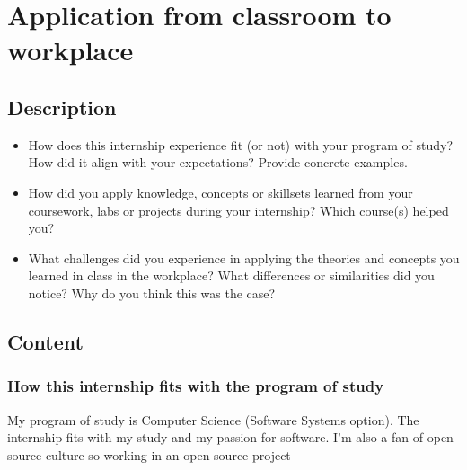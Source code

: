 \newpage
\section{Application from classroom to workplace}

\subsection{Description}

\begin{itemize}
    \item How does this internship experience fit (or not) with your program of study? How did it align with your expectations? Provide concrete examples.
    \item How did you apply knowledge, concepts or skillsets learned from your coursework, labs or projects during your internship? Which course(s) helped you?
    \item What challenges did you experience in applying the theories and concepts you learned in class in the workplace? What differences or similarities did you notice? Why do you think this was the case?
\end{itemize}

\subsection{Content}

\subsubsection{How this internship fits with the program of study}
My program of study is Computer Science (Software Systems option). The internship fits with my study and my passion for software.
I'm also a fan of open-source culture so working in an open-source project 
